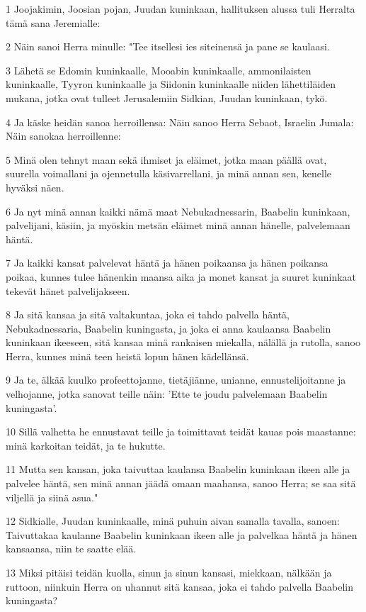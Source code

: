 \par 1 Joojakimin, Joosian pojan, Juudan kuninkaan, hallituksen alussa tuli Herralta tämä sana Jeremialle:
\par 2 Näin sanoi Herra minulle: "Tee itsellesi ies siteinensä ja pane se kaulaasi.
\par 3 Lähetä se Edomin kuninkaalle, Mooabin kuninkaalle, ammonilaisten kuninkaalle, Tyyron kuninkaalle ja Siidonin kuninkaalle niiden lähettiläiden mukana, jotka ovat tulleet Jerusalemiin Sidkian, Juudan kuninkaan, tykö.
\par 4 Ja käske heidän sanoa herroillensa: Näin sanoo Herra Sebaot, Israelin Jumala: Näin sanokaa herroillenne:
\par 5 Minä olen tehnyt maan sekä ihmiset ja eläimet, jotka maan päällä ovat, suurella voimallani ja ojennetulla käsivarrellani, ja minä annan sen, kenelle hyväksi näen.
\par 6 Ja nyt minä annan kaikki nämä maat Nebukadnessarin, Baabelin kuninkaan, palvelijani, käsiin, ja myöskin metsän eläimet minä annan hänelle, palvelemaan häntä.
\par 7 Ja kaikki kansat palvelevat häntä ja hänen poikaansa ja hänen poikansa poikaa, kunnes tulee hänenkin maansa aika ja monet kansat ja suuret kuninkaat tekevät hänet palvelijakseen.
\par 8 Ja sitä kansaa ja sitä valtakuntaa, joka ei tahdo palvella häntä, Nebukadnessaria, Baabelin kuningasta, ja joka ei anna kaulaansa Baabelin kuninkaan ikeeseen, sitä kansaa minä rankaisen miekalla, nälällä ja rutolla, sanoo Herra, kunnes minä teen heistä lopun hänen kädellänsä.
\par 9 Ja te, älkää kuulko profeettojanne, tietäjiänne, unianne, ennustelijoitanne ja velhojanne, jotka sanovat teille näin: 'Ette te joudu palvelemaan Baabelin kuningasta'.
\par 10 Sillä valhetta he ennustavat teille ja toimittavat teidät kauas pois maastanne: minä karkoitan teidät, ja te hukutte.
\par 11 Mutta sen kansan, joka taivuttaa kaulansa Baabelin kuninkaan ikeen alle ja palvelee häntä, sen minä annan jäädä omaan maahansa, sanoo Herra; se saa sitä viljellä ja siinä asua."
\par 12 Sidkialle, Juudan kuninkaalle, minä puhuin aivan samalla tavalla, sanoen: Taivuttakaa kaulanne Baabelin kuninkaan ikeen alle ja palvelkaa häntä ja hänen kansaansa, niin te saatte elää.
\par 13 Miksi pitäisi teidän kuolla, sinun ja sinun kansasi, miekkaan, nälkään ja ruttoon, niinkuin Herra on uhannut sitä kansaa, joka ei tahdo palvella Baabelin kuningasta?

